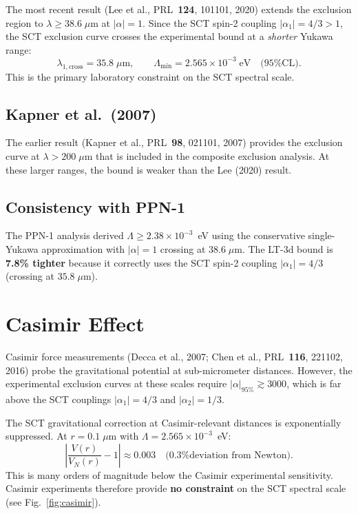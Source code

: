 \documentclass[11pt,a4paper]{article}
\begin{document}
The most recent result (Lee et al., PRL~\textbf{124}, 101101, 2020) extends
the exclusion region to $\lambda \geq 38.6\;\mu$m at $|\alpha| = 1$. Since
the SCT spin-2 coupling $|\alpha_1| = 4/3 > 1$, the SCT exclusion curve
crosses the experimental bound at a \emph{shorter} Yukawa range:
\begin{equation}
  \lambda_{1,\text{cross}} = 35.8\;\mu\text{m}, \qquad
  \boxed{\Lambda_{\min} = 2.565 \times 10^{-3}\;\text{eV}} \quad \text{(95\% CL)}.
  \label{eq:primary-bound}
\end{equation}
This is the primary laboratory constraint on the SCT spectral scale.

\subsection{Kapner et al.\ (2007)}

The earlier result (Kapner et al., PRL~\textbf{98}, 021101, 2007) provides the
exclusion curve at $\lambda > 200\;\mu$m that is included in the composite
exclusion analysis. At these larger ranges, the bound is weaker than the Lee
(2020) result.

\subsection{Consistency with PPN-1}

The PPN-1 analysis derived $\Lambda \geq 2.38 \times 10^{-3}$~eV using the
conservative single-Yukawa approximation with $|\alpha| = 1$ crossing at
$38.6\;\mu$m. The LT-3d bound is \textbf{7.8\% tighter} because it correctly
uses the SCT spin-2 coupling $|\alpha_1| = 4/3$ (crossing at $35.8\;\mu$m).

\section{Casimir Effect}
\label{sec:casimir}

Casimir force measurements (Decca et al., 2007; Chen et al., PRL~\textbf{116},
221102, 2016) probe the gravitational potential at sub-micrometer distances.
However, the experimental exclusion curves at these scales require
$|\alpha|_{\text{95\%}} \gtrsim 3000$, which is far above the SCT couplings
$|\alpha_1| = 4/3$ and $|\alpha_2| = 1/3$.

The SCT gravitational correction at Casimir-relevant distances is exponentially
suppressed. At $r = 0.1\;\mu$m with $\Lambda = 2.565 \times 10^{-3}$~eV:
\begin{equation}
  \left|\frac{V(r)}{V_N(r)} - 1\right| \approx 0.003
  \quad \text{(0.3\% deviation from Newton)}.
\end{equation}
This is many orders of magnitude below the Casimir experimental sensitivity.
Casimir experiments therefore provide \textbf{no constraint} on the SCT spectral
scale (see Fig.~\ref{fig:casimir}).
\end{document}
